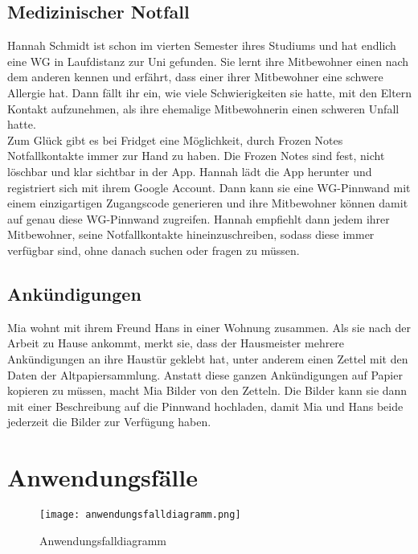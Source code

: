 \documentclass[a4paper]{scrreprt}
\begin{document}
        \subsection{Medizinischer Notfall}
        Hannah Schmidt ist schon im vierten Semester ihres Studiums und hat endlich eine WG in Laufdistanz zur Uni gefunden. Sie lernt ihre Mitbewohner einen nach dem anderen kennen und erfährt, dass einer ihrer Mitbewohner eine schwere Allergie hat. Dann fällt ihr ein, wie viele Schwierigkeiten sie hatte, mit den Eltern Kontakt aufzunehmen, als ihre ehemalige Mitbewohnerin einen schweren Unfall hatte.\\
        Zum Glück gibt es bei Fridget eine Möglichkeit, durch Frozen Notes Notfallkontakte immer zur Hand zu haben. Die Frozen Notes sind fest, nicht löschbar und klar sichtbar in der App. Hannah lädt die App herunter und registriert sich mit ihrem Google Account. Dann kann sie eine WG-Pinnwand mit einem einzigartigen Zugangscode generieren und ihre Mitbewohner können damit auf genau diese WG-Pinnwand zugreifen. Hannah empfiehlt dann jedem ihrer Mitbewohner, seine Notfallkontakte hineinzuschreiben, sodass diese immer verfügbar sind, ohne danach suchen oder fragen zu müssen.
        \newpage
        
        \subsection{Ankündigungen}
        Mia wohnt mit ihrem Freund Hans in einer Wohnung zusammen. Als sie nach der Arbeit zu Hause ankommt, merkt sie, dass der Hausmeister mehrere Ankündigungen an ihre Haustür geklebt hat, unter anderem einen Zettel mit den Daten der Altpapiersammlung.
        Anstatt diese ganzen Ankündigungen auf Papier kopieren zu müssen, macht Mia Bilder von den Zetteln. Die Bilder kann sie dann mit einer Beschreibung auf die Pinnwand hochladen, damit Mia und Hans beide jederzeit die Bilder zur Verfügung haben.
        

        \newpage
        \section{Anwendungsfälle}
        	\begin{figure}[h!]
        		\centering
        		\texttt{[image: anwendungsfalldiagramm.png]}
        		\caption{Anwendungsfalldiagramm}
        	\end{figure}
        	
        	\newpage
        	
\end{document}
